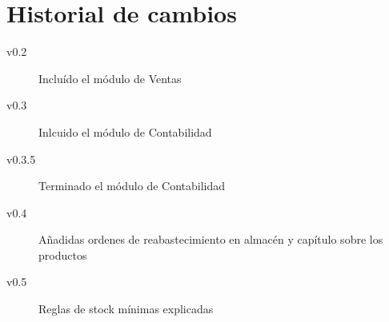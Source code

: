 \chapter*{Historial de cambios}
\begin{description}
  \item[v0.2] Incluído el módulo de Ventas
  \item[v0.3] Inlcuido el módulo de Contabilidad
  \item[v0.3.5] Terminado el módulo de Contabilidad
  \item[v0.4] Añadidas ordenes de reabastecimiento en almacén y capítulo sobre los productos
  \item[v0.5] Reglas de stock mínimas explicadas
\end{description}
